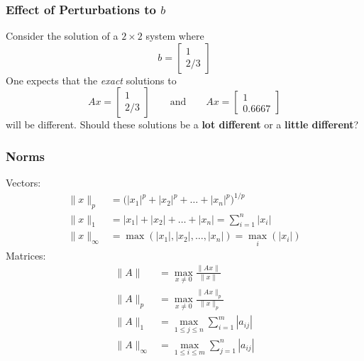 \documentclass[10pt]{beamer}
\newcommand{\matdim}[2]{\ensuremath{#1\times#2}}
\begin{document}
\begin{frame}
\frametitle{Effect of Perturbations to $b$}

Consider the solution of a \matdim{2}{2} system where
\begin{equation*}
    b = \begin{bmatrix}1 \\ 2/3 \end{bmatrix}
\end{equation*}
One expects that the
\emph{exact} solutions to
\begin{equation*}
    Ax = \begin{bmatrix}1 \\ 2/3 \end{bmatrix}
    \ \ \ \ \ \ \ \ \
    \text{and}
    \ \ \ \ \ \ \ \ \
    Ax = \begin{bmatrix}1 \\ 0.6667 \end{bmatrix}
\end{equation*}
will be different.  Should these solutions be a \textbf{lot different}
or a \textbf{little different}?

\end{frame}
\begin{frame}
\frametitle{Norms}
Vectors:
\begin{align*}
    \|x\|_{p} &= \bigl( |x_1|^p + |x_2|^p + \ldots + |x_n|^p \bigr)^{1/p}\\
    \|x\|_{1} &= |x_1| + |x_2| + \ldots + |x_n| = \sum_{i=1}^{n}{|x_i|}\\
    \|x\|_{\infty} &= \max \left(|x_1|, |x_2|, \ldots, |x_n| \right)
                      = \underset{i}{\max} \left( |x_i| \right)
\end{align*}
Matrices:
\begin{align*}
  \|A\| &= \max_{x\ne 0} \frac{\|Ax\|}{\|x\|}\\
  \|A\|_p &= \max_{x\ne 0} \frac{\|Ax\|_p}{\|x\|_p}\\
  \|A\|_1 &= \max_{1\leq j \leq n} \sum_{i=1}^{m}|a_{ij}|\\
  \|A\|_{\infty} &= \max_{1\leq i \leq m} \sum_{j=1}^{n}|a_{ij}|
\end{align*}

\end{frame}
\end{document}
